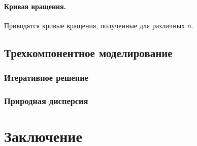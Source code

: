 \documentclass{matmex-diploma-custom}
\begin{document}
\pagebreak
\paragraph{Кривая вращения.} Приводятся кривые вращения, полученные для различных $n$. 

\pagebreak
\subsection{Трехкомпонентное моделирование}
\subsubsection{Итеративное решение}
\subsubsection{Природная дисперсия}
\section*{Заключение}
\setmonofont[Mapping=tex-text]{CMU Typewriter Text}
\pagebreak


\end{document}

